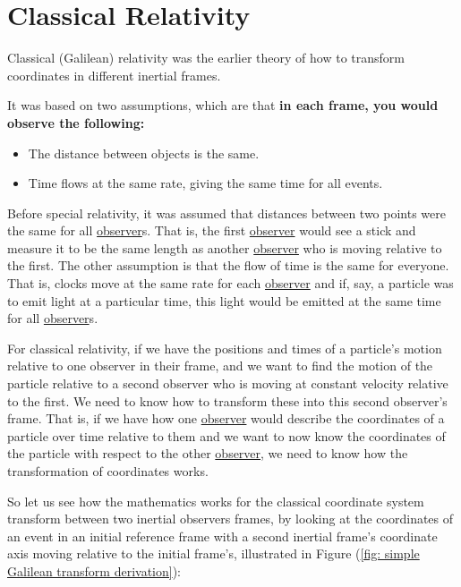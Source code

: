 \section{Classical Relativity} \label{sect: Classical Relativity}

Classical (Galilean) relativity was the earlier theory of how to transform coordinates in different inertial frames.

It was based on two assumptions, which are that \textbf{in each frame, you would observe the following:}

\begin{itemize}
	\item The distance between objects is the same.
	\item Time flows at the same rate, giving the same time for all events.
\end{itemize}

Before special relativity, it was assumed that distances between two points were the same for all \hyperlink{def-observer}{observer}s.
That is, the first \hyperlink{def-observer}{observer} would see a stick and measure it to be the same length as another \hyperlink{def-observer}{observer} who is moving relative to the first.
The other assumption is that the flow of time is the same for everyone.
That is, clocks move at the same rate for each \hyperlink{def-observer}{observer} and if, say, a particle was to emit light at a particular time, this light would be emitted at the same time for all \hyperlink{def-observer}{observer}s.

For classical relativity, if we have the positions and times of a particle's motion relative to one observer in their frame, and we want to find the motion of the particle relative to a second observer who is moving at constant velocity relative to the first.
We need to know how to transform these into this second observer's frame.
That is, if we have how one \hyperlink{def-observer}{observer} would describe the coordinates of a particle over time relative to them and we want to now know the coordinates of the particle with respect to the other \hyperlink{def-observer}{observer}, we need to know how the transformation of coordinates works.

So let us see how the mathematics works for the classical coordinate system transform between two inertial observers frames, by looking at the coordinates of an event in an initial reference frame with a second inertial frame's coordinate axis moving relative to the initial frame's, illustrated in Figure (\ref{fig: simple Galilean transform derivation}):

